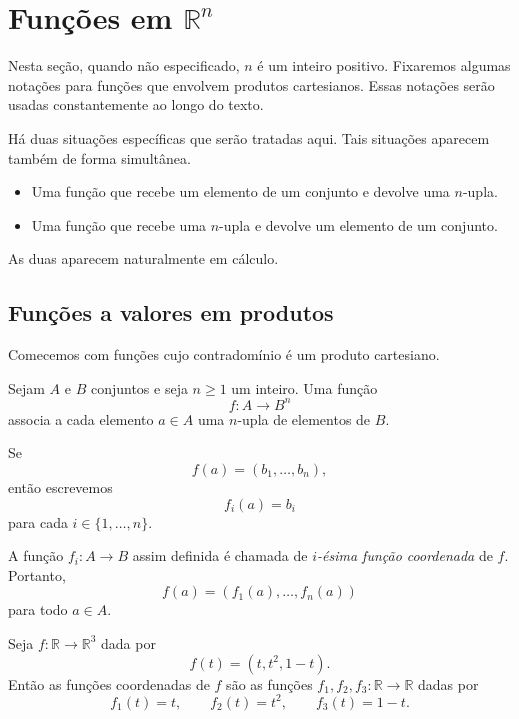 \section{Funções em \texorpdfstring{$\mathbb R^n$}{Rn}}

Nesta seção, quando não especificado, $n$ é um inteiro positivo.
Fixaremos algumas notações para funções que envolvem produtos cartesianos.
Essas notações serão usadas constantemente ao longo do texto.

Há duas situações específicas que serão tratadas aqui.
Tais situações aparecem também de forma simultânea.
\begin{itemize}
    \item Uma função que recebe um elemento de um conjunto e devolve uma $n$-upla.
    \item Uma função que recebe uma $n$-upla e devolve um elemento de um conjunto.
\end{itemize}

As duas aparecem naturalmente em cálculo.

\subsection{Funções a valores em produtos}

Comecemos com funções cujo contradomínio é um produto cartesiano.

\begin{definition}
    Sejam $A$ e $B$ conjuntos e seja $n\geq 1$ um inteiro.
    Uma função
    \[
        f:A\to B^n
    \]
    associa a cada elemento $a\in A$ uma $n$-upla de elementos de $B$.

    Se
    \[
        f(a)=(b_1,\ldots,b_n),
    \]
    então escrevemos
    \[
        f_i(a)=b_i
    \]
    para cada $i\in\{1,\ldots,n\}$.

    A função $f_i:A\to B$ assim definida é chamada de \emph{$i$-ésima função coordenada} de $f$.
    Portanto,
    \[
        f(a)=(f_1(a),\ldots,f_n(a))
    \]
    para todo $a\in A$.
\end{definition}

\begin{example}
    Seja $f:\mathbb R\to\mathbb R^3$ dada por
    \[
        f(t)=(t,t^2,1-t).
    \]
    Então as funções coordenadas de $f$ são as funções $f_1,f_2,f_3:\mathbb R\to\mathbb R$ dadas por
    \[
        f_1(t)=t,\qquad f_2(t)=t^2,\qquad f_3(t)=1-t.
    \]
\end{example}


